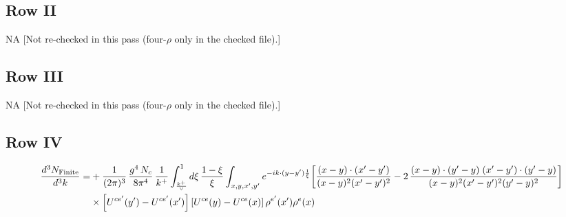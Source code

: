 \documentclass[9pt]{article}
\numberwithin{equation}{section}
\begin{document}
\subsection{Row II}
\textsc{NA} {\color{red}[Not re-checked in this pass (four-$\rho$ only in the checked file).]}
\subsection{Row III}
\textsc{NA} {\color{red}[Not re-checked in this pass (four-$\rho$ only in the checked file).]}
\subsection{Row IV}
\begin{align}
\frac{d^{3}N_{\rm Finite}}{d^{3}k}= &  +\frac{1}{(2\pi)^{3}}\,\frac{g^{4}\,N_{c}}{8\pi^{4}}\,\frac{1}{k^{+}}\int_{\frac{k^{+}}{\vee}}^{1}d\xi\,\frac{1-\xi}{\xi}\int_{x,y,x',y'}e^{-ik\cdot(y-y')\frac{1}{\xi}}\bigg[\frac{(x-y)\cdot(x'-y')}{(x-y)^{2}(x'-y')^{2}}-2\,\frac{(x-y)\cdot(y'-y)\;(x'-y')\cdot(y'-y)}{(x-y)^{2}(x'-y')^{2}(y'-y)^{2}}\bigg]\notag\\
&\times\left[U^{ce'}(y') - U^{ce'}(x')\right]\left[U^{ce}(y) - U^{ce}(x)\right]\rho^{e'}(x')\rho^{e}(x)
\end{align}
\end{document}
